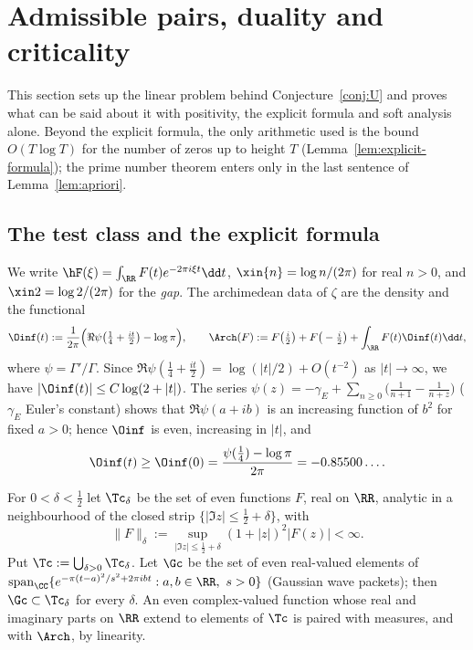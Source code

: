 \section{Admissible pairs, duality and criticality}\label{sec:setting}

This section sets up the linear problem behind Conjecture~\ref{conj:U} and proves what can be said about it with
positivity, the explicit formula and soft analysis alone. Beyond the explicit formula, the only arithmetic used is the
bound $O(T\log T)$ for the number of zeros up to height $T$ (Lemma~\ref{lem:explicit-formula}); the prime number theorem
enters only in the last sentence of Lemma~\ref{lem:apriori}.

\subsection{The test class and the explicit formula}

We write $\hF(\xi)=\int_\RR F(t)e^{-2\pi i\xi t}\dd t$, $\xin{n}=\log n/(2\pi)$ for real $n>0$, and $\xin2=\log2/(2\pi)$
for the \emph{gap}. The archimedean data of $\zeta$ are the density and the functional
\begin{equation}
\Oinf(t):=\frac1{2\pi}\Big(\Re\psi\big(\tfrac14+\tfrac{it}2\big)-\log\pi\Big),\qquad
\Arch(F):=F\big(\tfrac i2\big)+F\big(-\tfrac i2\big)+\int_\RR F(t)\Oinf(t)\dd t,
\end{equation}
where $\psi=\Gamma'/\Gamma$. Since $\Re\psi(\tfrac14+\tfrac{it}2)=\log(|t|/2)+O(t^{-2})$ as $|t|\to\infty$, we have
$|\Oinf(t)|\le C\log(2+|t|)$. The series $\psi(z)=-\gamma_E+\sum_{n\ge0}\big(\frac1{n+1}-\frac1{n+z}\big)$
($\gamma_E$ Euler's constant) shows that $\Re\psi(a+ib)$ is an increasing function of $b^2$ for fixed $a>0$; hence
$\Oinf$ is even, increasing in $|t|$, and
\begin{equation}\label{eq:Oinf0}
\Oinf(t)\ge\Oinf(0)=\frac{\psi(\frac14)-\log\pi}{2\pi}=-0.85500\ldots .
\end{equation}

\begin{definition}\label{def:testclass}
For $0<\delta<\frac12$ let $\Tc_\delta$ be the set of even functions $F$, real on $\RR$, analytic in a neighbourhood
of the closed strip $\{|\Im z|\le\frac12+\delta\}$, with
\[
\|F\|_\delta:=\sup_{|\Im z|\le\frac12+\delta}(1+|z|)^2|F(z)|<\infty .
\]
Put $\Tc:=\bigcup_{\delta>0}\Tc_\delta$. Let $\Gc$ be the set of even real-valued elements of
$\operatorname{span}_\CC\{e^{-\pi(t-a)^2/s^2+2\pi i bt}:a,b\in\RR,\ s>0\}$ (Gaussian wave packets); then
$\Gc\subset\Tc_\delta$ for every $\delta$. An even complex-valued function whose real and imaginary parts on $\RR$
extend to elements of $\Tc$ is paired with measures, and with $\Arch$, by linearity.
\end{definition}


